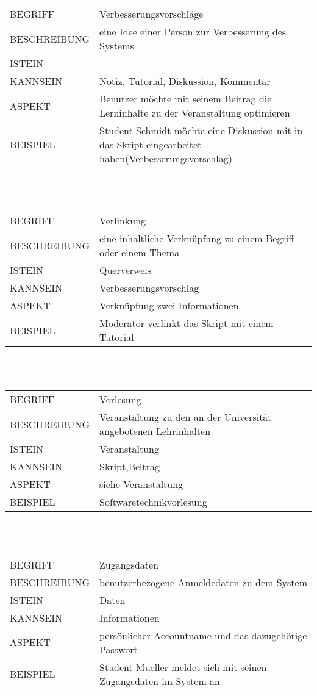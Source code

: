 \documentclass[12pt,a4paper]{article}
\begin{document}
\begin{tabular}{l p{10cm}}
BEGRIFF 	 & Verbesserungsvorschläge \\ 
BESCHREIBUNG & eine Idee einer Person zur Verbesserung des Systems\\ 
ISTEIN   	 & - \\
KANNSEIN 	 & Notiz, Tutorial, Diskussion, Kommentar\\ 
ASPEKT   	 & Benutzer möchte mit seinem Beitrag die Lerninhalte zu der 					   Veranstaltung optimieren\\
BEISPIEL 	 & Student Schmidt möchte eine Diskussion mit in das Skript 					   eingearbeitet haben(Verbesserungsvorschlag)\\
\hline
\end{tabular}\\\\

\begin{tabular}{l p{10cm}} 
BEGRIFF 	 & Verlinkung \\ 
BESCHREIBUNG & eine inhaltliche Verknüpfung zu einem Begriff oder einem Thema\\ 
ISTEIN   	 & Querverweis\\
KANNSEIN 	 & Verbesserungsvorschlag\\ 
ASPEKT   	 & Verknüpfung zwei Informationen\\
BEISPIEL 	 & Moderator verlinkt das Skript mit einem Tutorial\\
\hline
\end{tabular}\\\\ 

\begin{tabular}{l p{10cm}} 
BEGRIFF 	 & Vorlesung \\ 
BESCHREIBUNG & Veranstaltung zu den an der Universität angebotenen 							   Lehrinhalten\\ 
ISTEIN   	 & Veranstaltung\\
KANNSEIN 	 & Skript,Beitrag\\ 
ASPEKT   	 & siehe Veranstaltung\\
BEISPIEL 	 & Softwaretechnikvorlesung\\
\hline
\end{tabular}\\\\  

\begin{tabular}{l p{10cm}}
BEGRIFF 	 & Zugangsdaten \\ 
BESCHREIBUNG & benutzerbezogene Anmeldedaten zu dem System\\ 
ISTEIN   	 & Daten\\
KANNSEIN 	 & Informationen\\ 
ASPEKT   	 & persönlicher Accountname und das dazugehörige Passwort\\
BEISPIEL 	 & Student Mueller meldet sich mit seinen Zugangsdaten im System 				   an\\
\hline
\end{tabular}\\\\  
\end{document}
